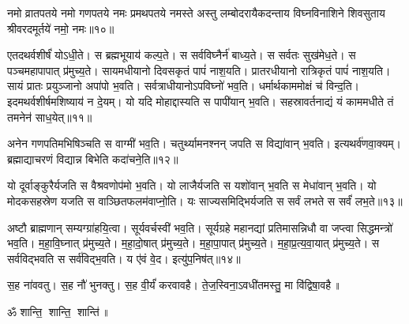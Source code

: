 नमो व्रातपतये नमो गणपतये नमः प्रमथपतये नमस्ते अस्तु लम्बोदरायैकदन्ताय विघ्नविनाशिने शिवसुताय श्रीवरदमू‍र्तये॑ नमो॒ नमः॥१०॥

एतदथर्वशीर्षं॑ योऽधी॒ते। स ब्रह्मभूयाय॑ कल्प॒ते।  स सर्वविघ्नैर्न॑ बाध्य॒ते।
स सर्वतः सुख॑मेध॒ते।  स पञ्चमहापापात् प्र॑मुच्य॒ते।
सायमधीयानो दिवसकृतं पापं॑ नाश॒यति।  प्रातरधीयानो रात्रिकृतं पापं॑ नाश॒यति।
सायं प्रातः प्रयुञ्जानो अपा॑पो भ॒वति।  सर्वत्राधीयानोऽपविघ्नो॑ भव॒ति।
धर्मार्थकाममोक्षं च॑ विन्द॒ति। इदमथर्वशीर्षमशिष्याय॑ न दे॒यम्।  यो यदि मोहाद्दास्यति स पापी॑यान् भ॒वति।
सहस्रावर्तनाद्यं यं काममधीते तं तमनेन॑ साध॒येत्॥११॥

अनेन गणपतिमभिषिञ्चति स वाग्मी॑ भव॒ति।  चतुर्थ्यामनश्नन् जपति स विद्या॑वान् भ॒वति।  इत्यथर्व॑णवा॒क्यम्। ब्रह्माद्याचरणं विद्यान्न बिभेति कदा॑चने॒ति॥१२॥

यो दूर्वाङ्कुरैर्यजति स वैश्रवणोप॑मो भ॒वति। यो लाजैर्यजति स यशो॑वान् भ॒वति स मेधा॑वान् भ॒वति। 
यो मोदकसहस्रेण यजति स वाञ्छितफलम॑वाप्नो॒ति। यः साज्यसमिद्भिर्यजति स सर्वं लभते स सर्वं॑ लभ॒ते॥१३॥

अष्टौ ब्राह्मणान् सम्यग्ग्रा॑हयि॒त्वा। सूर्यवर्चस्वी॑ भव॒ति।
सूर्यग्रहे महानद्यां प्रतिमासन्निधौ वा जप्त्वा सिद्धमन्त्रो॑ भव॒ति।
म॒हा॒वि॒घ्नात् प्र॑मुच्य॒ते।  म॒हा॒दो॒षात् प्र॑मुच्य॒ते। म॒हा॒पा॒पात् प्र॑मुच्य॒ते।
म॒हा॒प्र॒त्य॒वा॒यात् प्र॑मुच्य॒ते। स सर्वविद्भवति स सर्व॑विद्भ॒वति।\linebreak
य ए॑वं वे॒द।  इत्यु॑प॒निष॑त्॥१४॥

स॒ह ना॑ववतु। स॒ह नौ॑ भुनक्तु। स॒ह वी॒र्यं॑ करवावहै।
ते॒ज॒स्विना॒ऽवधी॑तमस्तु॒ मा वि॑द्विषा॒वहै॥

\centerline{ॐ शान्ति॒ शान्ति॒ शान्ति॑॥}